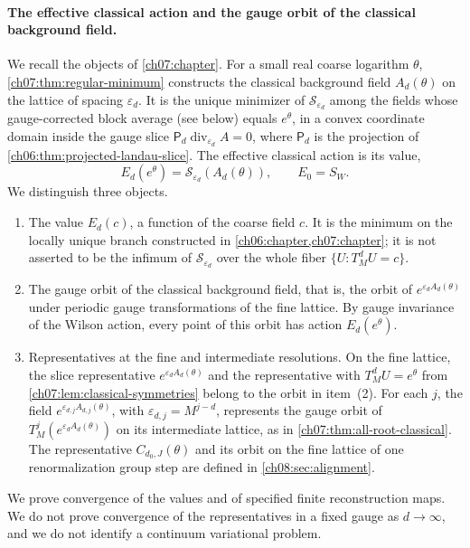 \paragraph{The effective classical action and the gauge orbit of the classical background field.}
We recall the objects of \cref{ch07:chapter}. For a small real coarse logarithm $\theta$, \cref{ch07:thm:regular-minimum} constructs the classical background field $A_d(\theta)$ on the lattice of spacing $\varepsilon_d$. It is the unique minimizer of $\mathscr S_{\varepsilon_d}$ among the fields whose gauge-corrected block average (see below) equals $e^\theta$, in a convex coordinate domain inside the gauge slice $\mathsf P_d\operatorname{div}_{\varepsilon_d}A=0$, where $\mathsf P_d$ is the projection of \cref{ch06:thm:projected-landau-slice}. The effective classical action is its value,
\[
 E_d(e^\theta)=\mathscr S_{\varepsilon_d}(A_d(\theta)),\qquad E_0=S_W.
\]
We distinguish three objects.
\begin{enumerate}
\item The value $E_d(c)$, a function of the coarse field $c$. It is the minimum on the locally unique branch constructed in \cref{ch06:chapter,ch07:chapter}; it is not asserted to be the infimum of $\mathscr S_{\varepsilon_d}$ over the whole fiber $\{U:T_M^dU=c\}$.
\item The gauge orbit of the classical background field, that is, the orbit of $e^{\varepsilon_dA_d(\theta)}$ under periodic gauge transformations of the fine lattice. By gauge invariance of the Wilson action, every point of this orbit has action $E_d(e^\theta)$.
\item Representatives at the fine and intermediate resolutions. On the fine lattice, the slice representative $e^{\varepsilon_dA_d(\theta)}$ and the representative with $T_M^dU=e^\theta$ from \cref{ch07:lem:classical-symmetries} belong to the orbit in item~(2). For each $j$, the field $e^{\varepsilon_{d,j}A_{d,j}(\theta)}$, with $\varepsilon_{d,j}=M^{j-d}$, represents the gauge orbit of $T_M^j(e^{\varepsilon_dA_d(\theta)})$ on its intermediate lattice, as in \cref{ch07:thm:all-root-classical}. The representative $C_{d_0,J}(\theta)$ and its orbit on the fine lattice of one renormalization group step are defined in \cref{ch08:sec:alignment}.
\end{enumerate}
We prove convergence of the values and of specified finite reconstruction maps. We do not prove convergence of the representatives in a fixed gauge as $d\to\infty$, and we do not identify a continuum variational problem.

